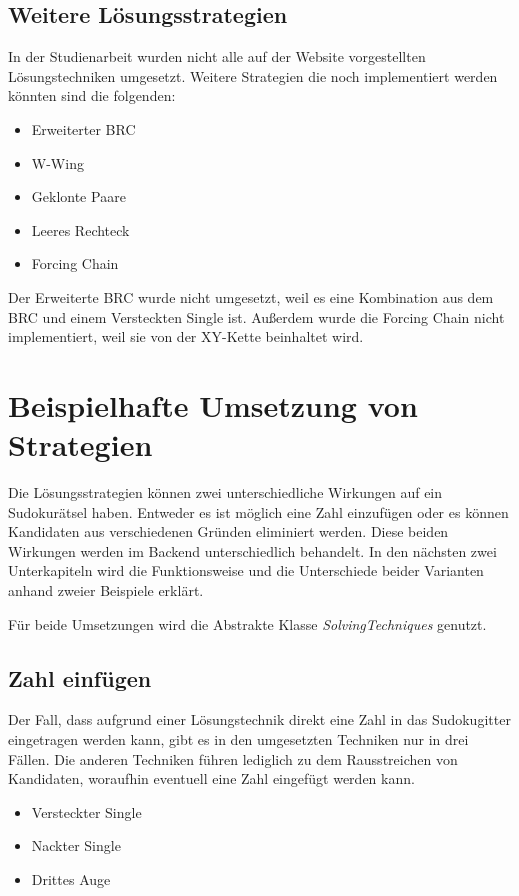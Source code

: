 \subsection{Weitere Lösungsstrategien}
In der Studienarbeit wurden nicht alle auf der Website \cite{martin} vorgestellten Lösungstechniken umgesetzt. Weitere Strategien die noch implementiert werden könnten sind die folgenden:
\begin{itemize}
	\item Erweiterter \ac{BRC}
	\item W-Wing
	\item Geklonte Paare
	\item Leeres Rechteck
	\item Forcing Chain
\end{itemize}

Der Erweiterte \ac{BRC} wurde nicht umgesetzt, weil es eine Kombination aus dem \ac{BRC} und einem Versteckten Single ist. Außerdem wurde die Forcing Chain nicht implementiert, weil sie von der XY-Kette beinhaltet wird.

\section{Beispielhafte Umsetzung von Strategien}
Die Lösungsstrategien können zwei unterschiedliche Wirkungen auf ein Sudokurätsel haben. Entweder es ist möglich eine Zahl einzufügen oder es können Kandidaten aus verschiedenen Gründen eliminiert werden. Diese beiden Wirkungen werden im Backend unterschiedlich behandelt. In den nächsten zwei Unterkapiteln wird die Funktionsweise und die Unterschiede beider Varianten anhand zweier Beispiele erklärt. 

Für beide Umsetzungen wird die Abstrakte Klasse \textit{SolvingTechniques} genutzt.

\subsection{Zahl einfügen}

Der Fall, dass aufgrund einer Lösungstechnik direkt eine Zahl in das Sudokugitter eingetragen werden kann, gibt es in den umgesetzten Techniken nur in drei Fällen. Die anderen Techniken führen lediglich zu dem Rausstreichen von Kandidaten, woraufhin eventuell eine Zahl eingefügt werden kann.
\begin{itemize}
	\item Versteckter Single
	\item Nackter Single
	\item Drittes Auge
\end{itemize}

